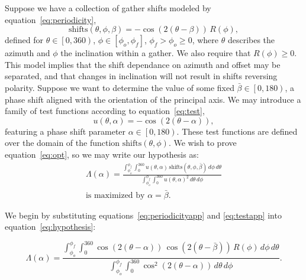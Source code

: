 
Suppose we have a collection of gather shifts modeled by equation~\ref{eq:periodicity},
\begin{equation} 
\label{eq:periodicityapp}
\textrm{shifts} \left( \theta,\phi, \beta \right) =   -\cos \left(2 \left( \theta-\beta \right) \right) \, R \left(\phi \right),
\end{equation}
 defined for $\theta \in \left[ 0, 360 \right)$, $\phi \in \left[\phi_{o}, \phi_{f} \right]$, $\phi_{f} > \phi_{o} \geq 0$, where $\theta$ describes the azimuth and $\phi$ the inclination within a gather. We also require that $R \left(\phi \right) \geq 0$.  This model implies that the shift dependance on azimuth and offset may be separated, and that changes in inclination will not result in shifts reversing polarity. Suppose we want to determine the value of some fixed $\bar{\beta} \in \left[ 0,180 \right)$, a phase shift aligned with the orientation of the principal axis.
We may introduce a family of test functions according to equation~\ref{eq:test}, 
\begin{equation}
\label{eq:testapp}
u \left( \theta,\alpha \right) = -\cos \left(2 \left( \theta-\alpha \right) \right),
\end{equation}
featuring a phase shift parameter $\alpha \in \left[0,180\right)$.  These test functions are  defined over the domain of the function $\textrm{shifts}\left( \theta,\phi \right)$.  We wish to prove equation~\ref{eq:opt}, so we may write our hypothesis as:
\begin{equation}
\label{eq:hypothesis}
\begin{split}
\Lambda(\alpha) = \frac{ \int_{\phi_{o}} ^{\phi_{f}} \int_0 ^{360} u\left(\theta,\alpha \right) \, \textrm{shifts} \left( \theta,\phi,\bar{\beta} \right) \, d\phi \, d\theta}{\int_{\phi_{o}} ^{\phi_{f}} \int_{0} ^{360} u\left(\theta, \alpha \right)^2 \, d\theta \,  d\phi } \\
\textrm{is maximized by }\alpha = \bar{\beta} .
\end{split}
\end{equation}

We begin by substituting equations~\ref{eq:periodicityapp} and \ref{eq:testapp} into equation~\ref{eq:hypothesis}:

\begin{equation}
\label{eq:subst}
\Lambda(\alpha) = \frac{  \int_{\phi_{o}} ^{\phi_{f}} \int_0 ^{360} \cos \left(2 \left(\theta-\alpha \right) \right) \, \cos \left(2 \left( \theta-\bar{\beta} \right) \right) \, R \left(\phi \right) \, d\phi \, d\theta}{\int_{\phi_{o}} ^{\phi_{f}} \int_{0} ^{360} \cos^2 \left(2 \left( \theta - \alpha \right)\right) \,  d\theta \,  d\phi } .
\end{equation}

